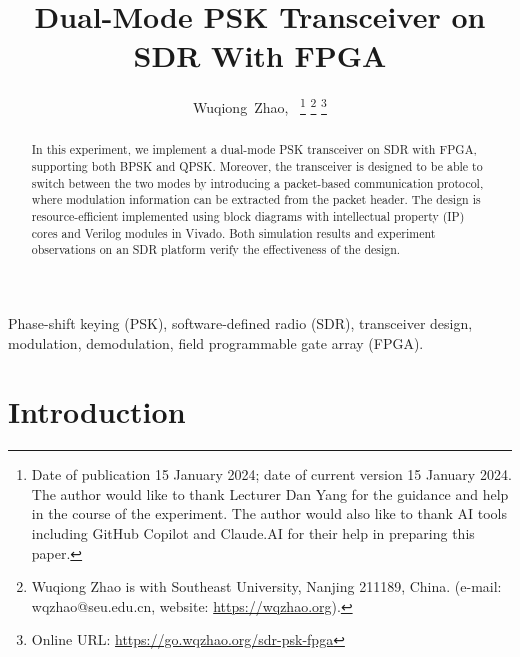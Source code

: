 \documentclass[journal,twoside]{IEEEtran}
\begin{document}
  \title{Dual-Mode PSK Transceiver on SDR With FPGA}

  \author{%
    Wuqiong~Zhao{\hspace{.1em}\textsuperscript{}},~
    \thanks{Date of publication 15 January 2024; date of current version 15 January 2024.
      The author would like to thank Lecturer Dan Yang for the guidance and help in the course of the experiment.
      The author would also like to thank AI tools including GitHub Copilot and Claude.AI for their help in preparing this paper.}
    \thanks{Wuqiong Zhao is with Southeast University, Nanjing 211189, China. (e-mail: wqzhao@seu.edu.cn, website: \url{https://wqzhao.org}).}
    \thanks{Online URL: \url{https://go.wqzhao.org/sdr-psk-fpga}}
  }

  \maketitle

  \begin{abstract}
    In this experiment, we implement a dual-mode PSK transceiver on SDR with FPGA,
    supporting both BPSK and QPSK.
    Moreover, the transceiver is designed to be able to switch between the two modes by introducing a packet-based communication protocol,
    where modulation information can be extracted from the packet header.
    The design is resource-efficient implemented using block diagrams with intellectual property (IP) cores and Verilog modules in Vivado.
    Both simulation results and experiment observations on an SDR platform verify the effectiveness of the design.
  \end{abstract}
  \begin{IEEEkeywords}
    Phase-shift keying (PSK), software-defined radio (SDR), transceiver design, modulation, demodulation, field programmable gate array (FPGA).
  \end{IEEEkeywords}

  \section{Introduction}
\end{document}
